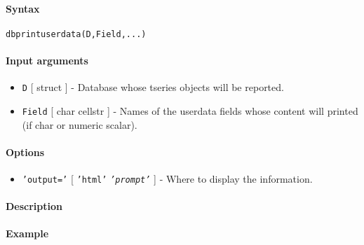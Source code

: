 


	\paragraph{Syntax}

\begin{verbatim}
dbprintuserdata(D,Field,...)
\end{verbatim}

\paragraph{Input arguments}

\begin{itemize}
\item
  \texttt{D} {[} struct {]} - Database whose tseries objects will be
  reported.
\item
  \texttt{Field} {[} char \textbar{} cellstr {]} - Names of the userdata
  fields whose content will printed (if char or numeric scalar).
\end{itemize}

\paragraph{Options}

\begin{itemize}
\itemsep1pt\parskip0pt
\item
  \texttt{'output='} {[} \texttt{'html'} \textbar{}
  \emph{\texttt{'prompt'}} {]} - Where to display the information.
\end{itemize}

\paragraph{Description}

\paragraph{Example}


